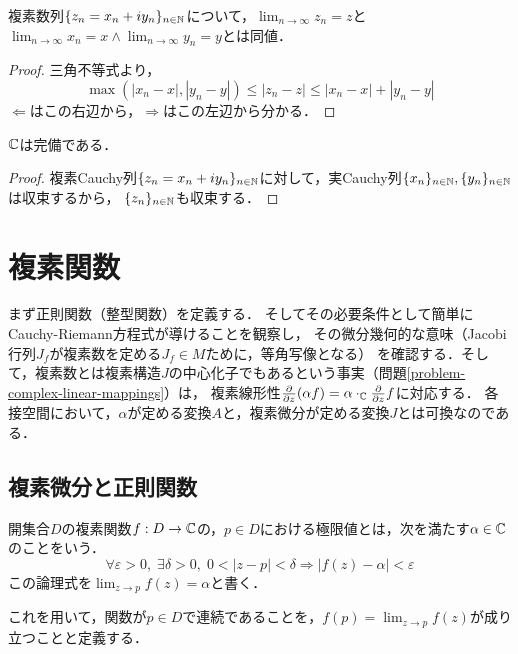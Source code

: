 \documentclass[uplatex, dvipdfmx]{jsreport}
\begin{document}
\begin{proposition}[$\R^2$として]
    複素数列$\{z_n=x_n+iy_n\}_{n\in\mathbb{N}}$について，$\lim_{n\to\infty}z_n=z$と$\lim_{n\to\infty}x_n=x\land\lim_{n\to\infty}y_n=y$とは同値．
\end{proposition}
\begin{proof}
    三角不等式より，
    \[ \max(|x_n-x|,|y_n-y|)\le |z_n-z| \le |x_n-x|+|y_n-y| \]
    $\Leftarrow$はこの右辺から，$\Rightarrow$はこの左辺から分かる．
\end{proof}

\begin{proposition}[completeness]
    $\mathbb{C}$は完備である．
\end{proposition}
\begin{proof}
    複素Cauchy列$\{z_n=x_n+iy_n\}_{n\in\mathbb{N}}$に対して，実Cauchy列$\{x_n\}_{n\in\mathbb{N}},\{y_n\}_{n\in\mathbb{N}}$は収束するから，
    $\{z_n\}_{n\in\mathbb{N}}$も収束する．
\end{proof}

\section{複素関数}

\begin{screen}
    まず正則関数（整型関数）を定義する．
    そしてその必要条件として簡単にCauchy-Riemann方程式が導けることを観察し，
    その微分幾何的な意味（Jacobi行列$J_f$が複素数を定める$J_f\in M$ために，等角写像となる）
    を確認する．そして，複素数とは複素構造$J$の中心化子でもあるという事実（問題\ref{problem-complex-linear-mappings}）は，
    複素線形性$\frac{\partial}{\partial z}(\alpha f)=\alpha\cdot_{\mathbb{C}}\frac{\partial}{\partial z} f$に対応する．
    各接空間において，$\alpha$が定める変換$A$と，複素微分が定める変換$J$とは可換なのである．
\end{screen}

\subsection{複素微分と正則関数}

\begin{definition}
    開集合$D$の複素関数$f:D\to\mathbb{C}$の，$p\in D$における極限値とは，次を満たす$\alpha\in\mathbb{C}$のことをいう．
    \[ \forall\varepsilon>0,\;\exists\delta>0,\;0<|z-p|<\delta\Rightarrow|f(z)-\alpha|<\varepsilon \]
    この論理式を$\lim_{z\to p}f(z)=\alpha$と書く．

    これを用いて，関数が$p\in D$で連続であることを，$f(p)=\lim_{z\to p}f(z)$が成り立つことと定義する．
\end{definition}
\end{document}
